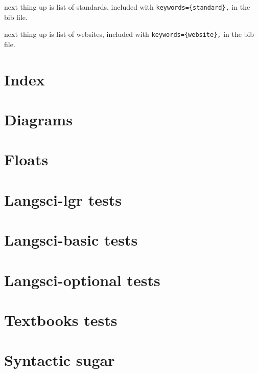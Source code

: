 \documentclass[output=book
  ,colorlinks
  ,showindex
  ,draftmode
  ,openreview
  ,nobabel
  ,booklanguage=italian
  ,oldstylenumbers
  ,multiauthors
  ,biblatex
  ]{langscibook}
\begin{document}
\printbibliography[notkeyword={techreport},notkeyword={website},title={References}]

next thing up is list of standards, included with \verb+keywords={standard},+ in the bib file.

\printbibliography[keyword={standard},title={Standards}]



next thing up is list of websites, included with \verb+keywords={website},+ in the bib file.

\printbibliography[keyword={website},title={Websites}]



\section{Index}


\section{Diagrams}


\section{Floats}



%
\section{Langsci-lgr tests}


\section{Langsci-basic tests}
% 

\section{Langsci-optional tests}
% 

\section{Textbooks tests}
% 
% 
% 

\section{Syntactic sugar}


\end{document}

